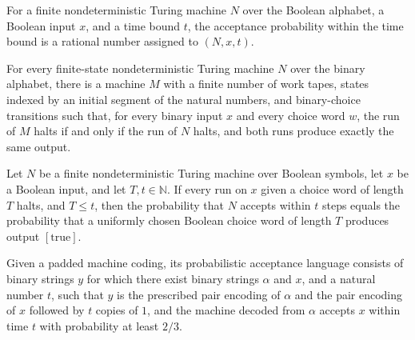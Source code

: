 \begin{definition}
\label{Turing.FinNDTM.acceptWithinProb}
\leanok
{}
For a finite nondeterministic Turing machine $N$ over the Boolean alphabet, a Boolean
input $x$, and a time bound $t$, the acceptance probability within the time bound is a
rational number assigned to $(N,x,t)$.
\end{definition}

\begin{theorem}
\label{Turing.FinNDTM.exists_codePTM}
\leanok
{}
For every finite-state nondeterministic Turing machine $N$ over the binary alphabet,
there is a machine $M$ with a finite number of work tapes, states indexed by an initial
segment of the natural numbers, and binary-choice transitions such that, for every
binary input $x$ and every choice word $w$, the run of $M$ halts if and only if the run
of $N$ halts, and both runs produce exactly the same output.
\end{theorem}

\begin{theorem}
\label{Turing.FinNDTM.acceptWithinProb_eq_outputProb}
\leanok
{}
Let $N$ be a finite nondeterministic Turing machine over Boolean symbols, let $x$ be a
Boolean input, and let $T,t\in\mathbb{N}$. If every run on $x$ given a choice word of
length $T$ halts, and $T\le t$, then the probability that $N$ accepts within $t$ steps
equals the probability that a uniformly chosen Boolean choice word of length $T$
produces output $[\mathrm{true}]$.
\end{theorem}

\begin{definition}
\label{Randomized.ProbAccept}
\leanok
{}
Given a padded machine coding, its probabilistic acceptance language consists of binary
strings $y$ for which there exist binary strings $\alpha$ and $x$, and a natural number
$t$, such that $y$ is the prescribed pair encoding of $\alpha$ and the pair encoding of
$x$ followed by $t$ copies of $1$, and the machine decoded from $\alpha$ accepts $x$
within time $t$ with probability at least $2/3$.
\end{definition}

